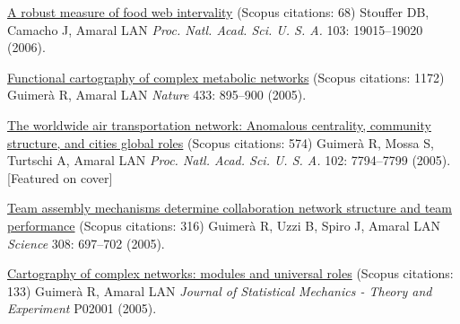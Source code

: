 \NumberedItem{\makebox[0.8cm][r]{[65]}}
\href{/people/amaral/a-robust-measure-of-food-web-intervality}
{A robust measure of food web intervality}
    (Scopus citations: 68)
\newline
Stouffer DB, Camacho J, Amaral LAN
\newline
\textit{Proc. Natl. Acad. Sci. U. S. A.}
    103:
19015--19020 (2006).
\newline
\Gap
~
\Gap

\NumberedItem{\makebox[0.8cm][r]{[64]}}
\href{/people/amaral/functional-cartography-of-complex-metabolic-networks}
{Functional cartography of complex metabolic networks}
    (Scopus citations: 1172)
\newline
Guimer\`a R, Amaral LAN
\newline
\textit{Nature}
    433:
895--900 (2005).
\newline
\Gap
~
\Gap

\NumberedItem{\makebox[0.8cm][r]{[63]}}
\href{/people/amaral/the-worldwide-air-transportation-network-anomalous-centrality-community-structure-and-cities-global-roles}
{The worldwide air transportation network: Anomalous centrality, community structure, and cities global roles}
    (Scopus citations: 574)
\newline
Guimer\`a R, Mossa S, Turtschi A, Amaral LAN
\newline
\textit{Proc. Natl. Acad. Sci. U. S. A.}
    102:
7794--7799 (2005).
    [Featured on cover]
\newline
\Gap
~
\Gap

\NumberedItem{\makebox[0.8cm][r]{[62]}}
\href{/people/amaral/team-assembly-mechanisms-determine-collaboration-network-structure-and-team-performance}
{Team assembly mechanisms determine collaboration network structure and team performance}
    (Scopus citations: 316)
\newline
Guimer\`a R, Uzzi B, Spiro J, Amaral LAN
\newline
\textit{Science}
    308:
697--702 (2005).
\newline
\Gap
~
\Gap

\NumberedItem{\makebox[0.8cm][r]{[61]}}
\href{/people/amaral/cartography-of-complex-networks-modules-and-universal-roles}
{Cartography of complex networks: modules and universal roles}
    (Scopus citations: 133)
\newline
Guimer\`a R, Amaral LAN
\newline
\textit{Journal of Statistical Mechanics - Theory and Experiment}
P02001 (2005).
\newline
\Gap
~
\Gap

